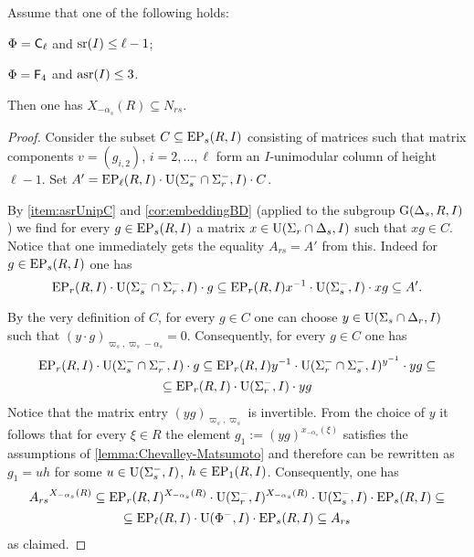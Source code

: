 \begin{lemma}\label{lemma:DVST}
Assume that one of the following holds:
\begin{lemlist}
 \item \label{lemma:DVcaseCl} $\Phi=\mathsf{C}_\ell$ and $\operatorname{sr}(I) \leq \ell-1$;
 \item \label{lemma:DVcaseF4} $\Phi=\mathsf{F}_4$ and $\operatorname{asr}(I) \leq 3$.
\end{lemlist}
Then one has $X_{-\alpha_s}(R) \subseteq N_{rs}$.
\end{lemma}
\begin{proof}
Consider the subset $C \subseteq \operatorname{EP}_s(R, I)$ consisting of matrices such that matrix components $v=(g_{i,2})$, $i=2,\ldots, \ell$ form an $I$-unimodular column of height $\ell-1$.
Set $A' = \operatorname{EP}_\ell(R, I) \cdot \operatorname{U}(\Sigma_s^- \cap \Sigma_r^-, I) \cdot C$.

By \cref{item:asrUnipC} and \cref{cor:embeddingBD} (applied to the subgroup $\operatorname{G}(\Delta_s, R, I)$) we find for every $g \in \operatorname{EP}_s(R, I)$ a matrix $x \in \operatorname{U}(\Sigma_r \cap \Delta_s, I)$ such that $xg \in C$.  
Notice that one immediately gets the equality $A_{rs} = A'$ from this.
Indeed for $g\in \operatorname{EP}_s(R, I)$ one has
\begin{equation*} \operatorname{EP}_r(R, I) \cdot \operatorname{U}(\Sigma_s^- \cap \Sigma_r^-, I) \cdot g \subseteq 
 \operatorname{EP}_r(R, I)x^{-1}  \cdot \operatorname{U}(\Sigma_s^-, I) \cdot xg \subseteq A'. \end{equation*}

By the very definition of $C$, for every $g \in C$ one can choose $y \in \operatorname{U}(\Sigma_s \cap \Delta_r, I)$ such that $(y \cdot g)_{\varpi_s,\varpi_s - \alpha_s} = 0$.
Consequently, for every $g\in C$ one has
\begin{multline*}
 \operatorname{EP}_r(R, I) \cdot \operatorname{U}(\Sigma_s^- \cap \Sigma_r^-, I) \cdot g \subseteq \operatorname{EP}_r(R, I) y^{-1} \cdot \operatorname{U}(\Sigma_r^-\cap \Sigma_s^-, I)^{y^{-1}} \cdot y g \subseteq \\
  \subseteq \operatorname{EP}_r(R, I) \cdot \operatorname{U}(\Sigma_r^-, I) \cdot y g
\end{multline*}
Notice that the matrix entry $(yg)_{\varpi_s,\varpi_s}$ is invertible.
From the choice of $y$ it follows that for every $\xi\in R$ the element $g_1:=(yg)^{x_{-\alpha_s}(\xi)}$
satisfies the assumptions of \cref{lemma:Chevalley-Matsumoto} and therefore can be rewritten as $g_1 = uh$ for some $u \in \operatorname{U}(\Sigma_s^-, I)$, $h \in \operatorname{EP}_1(R, I)$.
Consequently, one has
\begin{multline*} {A_{rs}}^{X_{-\alpha_{s}}(R)} \subseteq \operatorname{EP}_r(R, I)^{X_{-\alpha_{s}}(R)} \cdot \operatorname{U}(\Sigma_r^-, I)^{X_{-\alpha_{s}}(R)} \cdot \operatorname{U}(\Sigma_s^-, I) \cdot \operatorname{EP}_s(R, I) \subseteq \\
 \subseteq \operatorname{EP}_\ell(R, I) \cdot \operatorname{U}(\Phi^-, I) \cdot \operatorname{EP}_s(R, I) \subseteq A_{rs} \end{multline*}
 as claimed.
\end{proof}

